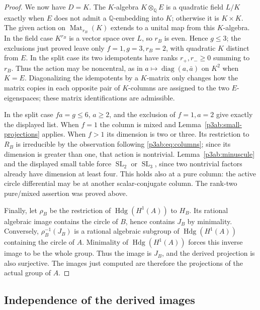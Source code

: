 \documentclass[11pt]{article}
\newcommand{\Q}{\mathbb Q}
\numberwithin{equation}{section}
\begin{document}
\begin{proof}
We now have \(D=K\).  The \(K\)-algebra \(K\otimes_\Q E\)
is a quadratic field \(L/K\) exactly when \(E\) does not admit
a \(\Q\)-embedding into \(K\); otherwise it is \(K\times K\).
The given action on \(\operatorname{Mat}_{r_B}(K)\) extends to
a unital map from this \(K\)-algebra.  In the field case
\(K^{r_B}\) is a vector space over \(L\), so \(r_B\) is
even.  Hence \(g\leq3\); the exclusions just proved leave only
\(f=1,g=3,r_B=2\), with quadratic \(K\) distinct from \(E\).
In the split case its two idempotents have ranks
\(r_+,r_-\geq0\) summing to \(r_B\).  Thus the action may be
noncentral, as in \(a\mapsto\operatorname{diag}(a,\bar a)\)
on \(K^2\) when \(K=E\).  Diagonalizing the idempotents by a
\(K\)-matrix only changes how the matrix copies in each opposite
pair of \(K\)-columns are assigned to the two \(E\)-eigenspaces;
these matrix identifications are admissible.

In the split case \(fa=g\leq6\), \(a\geq2\), and the exclusion
of \(f=1,a=2\) give exactly the displayed list.  When \(f=1\)
the column is mixed and Lemma~\ref{p3ab:small-projections}
applies.  When \(f>1\) its dimension is two or three.  Its
restriction to \(R_B\) is irreducible by the observation following
\eqref{p3ab:eq:columns}; since its dimension is greater than one,
that action is nontrivial.
Lemma~\ref{p3ab:minuscule} and the displayed small table force
\(\operatorname{SL}_2\) or \(\operatorname{SL}_3\), since two
nontrivial factors already have dimension at least four.  This
holds also at a pure column: the active circle differential may
be at another scalar-conjugate column.  The rank-two pure/mixed
assertion was proved above.

Finally, let \(\rho_B\) be the restriction of
\(\operatorname{Hdg}(H^1(A))\) to \(H_B\).  Its rational algebraic
image contains the circle of \(B\), hence contains \(J_B\) by
minimality.  Conversely, \(\rho_B^{-1}(J_B)\) is a rational
algebraic subgroup of \(\operatorname{Hdg}(H^1(A))\) containing the
circle of \(A\).  Minimality of \(\operatorname{Hdg}(H^1(A))\)
forces this inverse image to be the whole group.  Thus the image is
\(J_B\), and the derived projection is also surjective.  The images
just computed are therefore the projections of the actual group of
\(A\).
\end{proof}

\subsection{Independence of the derived images}
\end{document}
